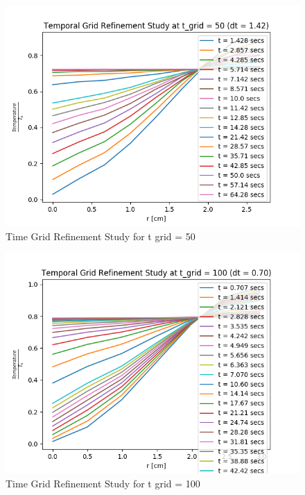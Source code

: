 \documentclass[12pt,letterpaper]{article}
\begin{document}
\begin{figure}[htbp!]
  \begin{center}
    \includegraphics[scale=0.7]{t_grid_50.png}
  \end{center}
  \caption{Time Grid Refinement Study for t grid = 50}
  \label{fig:t_50}
\end{figure}


\begin{figure}[htbp!]
  \begin{center}
    \includegraphics[scale=0.7]{t_grid_100.png}
  \end{center}
  \caption{Time Grid Refinement Study for t grid = 100}
  \label{fig:t_100}
\end{figure}
\end{document}

